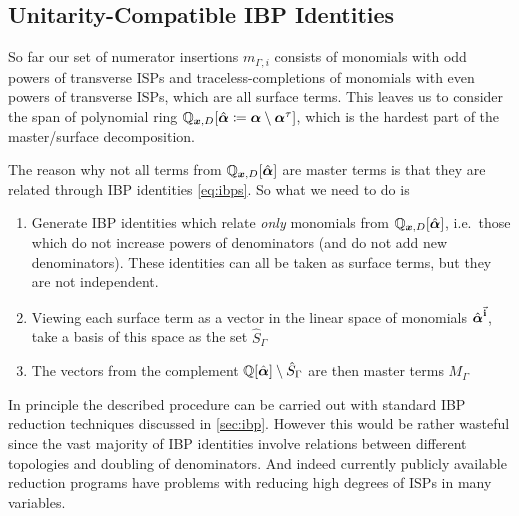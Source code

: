 


\subsection{Unitarity-Compatible IBP Identities}
\label{sec:unitarity_compatible_ibps}
So far our set of numerator insertions $m_{\Gamma,i}$ consists of monomials with odd powers of transverse ISPs and traceless-completions of
monomials with even powers of transverse ISPs, which are all surface terms.
This leaves us to consider the span of polynomial ring $\mathbb{Q}_{\vb*{x},D}[\hat{\vb*{\alpha}}\coloneqq \vb*{\alpha}\setminus\vb*{\alpha}^\tau]$,
which is the hardest part of the master/surface decomposition.

The reason why not all terms from $\mathbb{Q}_{\vb*{x},D}[\hat{\vb*{\alpha}}]$ are master terms is that they are
related through IBP identities \eqref{eq:ibps}. So what we need to do is
\begin{enumerate}
  \item Generate IBP identities which relate
    \emph{only} monomials from $\mathbb{Q}_{\vb*{x},D}[\hat{\vb*{\alpha}}]$, i.e.\ those which do not increase powers of denominators (and do not add new denominators).
    These identities can all be taken as surface terms, but they are not independent. 
    \label{item1}
  \item  Viewing each surface term as a vector in the linear space of monomials $\hat{\vb*{\alpha}}^{\va{i}}$, take
    a basis of this space as the set $\hat{S}_\Gamma$
    \label{item2}
  \item The vectors from the complement $\mathbb{Q}[\hat{\vb*{\alpha}}]\setminus \hat{S}_\Gamma$ are then master terms $M_\Gamma$
    \label{item3}
\end{enumerate}

In principle the described procedure can be carried out with standard IBP reduction techniques discussed in \cref{sec:ibp}.
However this would be rather wasteful
since the vast majority of IBP identities involve relations between different topologies and doubling of denominators.
And indeed currently publicly available reduction programs
\cite{Studerus:2009ye,vonManteuffel:2012np, Smirnov:2008iw,Smirnov:2014hma, Lee:2012cn,Lee:2013mka, Maierhoefer:2017hyi,Maierhofer:2018gpa}
have problems with reducing high degrees of ISPs in many variables.

